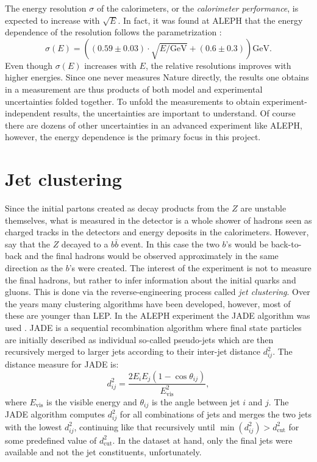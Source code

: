 The energy resolution $\sigma$ of the calorimeters, or the \emph{calorimeter performance}, is expected to increase with $\sqrt{E}$. In fact, it was found at ALEPH that the energy dependence of the resolution follows the parametrization \autocite{buskulicInvestigationBd0Bs01994}:
\begin{equation}
  \sigma(E) = \left( \left( 0.59 \pm 0.03 \right) \cdot \sqrt{E / \mathrm{GeV}} +  \left(0.6 \pm 0.3 \right) \right) \mathrm{GeV}.
\end{equation}
Even though $\sigma(E)$ increases with $E$, the relative resolutions improves with higher energies. Since one never measures Nature directly, the results one obtains in a measurement are thus products of both model and experimental uncertainties folded together. To unfold the measurements to obtain experiment-independent results, the uncertainties are important to understand. Of course there are dozens of other uncertainties in an advanced experiment like ALEPH, however, the energy dependence is the primary focus in this project. 

\section{Jet clustering}

Since the initial partons created as decay products from the $Z$ are unstable themselves, what is measured in the detector is a whole shower of hadrons seen as charged tracks in the detectors and energy deposits in the calorimeters. However, say that the $Z$  decayed to a $b\bar{b}$ event. In this case the two $b$'s would be back-to-back and the final hadrons would be observed approximately in the same direction as the $b$'s were created. The interest of the experiment is not to measure the final hadrons, but rather to infer information about the initial quarks and gluons. This is done via the reverse-engineering process called \emph{jet clustering}. Over the years many clustering algorithms have been developed, however, most of these are younger than LEP. In the ALEPH experiment the JADE algorithm was used \autocite{bartelExperimentalStudyJets1981}. JADE is a sequential recombination algorithm where final state particles are initially described as individual so-called pseudo-jets which are then recursively merged to larger jets according to their inter-jet distance $d^2_{ij}$. The distance measure for JADE is:
\begin{equation}
  d^2_{ij} = \frac{2E_i E_j (1 - \cos\theta_{ij})}{E^2_\mathrm{vis}},
\end{equation}
where $E_\mathrm{vis}$ is the visible energy and $\theta_{ij}$ is the angle between jet $i$ and $j$. The JADE algorithm computes $d^2_{ij}$ for all combinations of jets and merges the two jets with the lowest $d^2_{ij}$, continuing like that recursively until $\min(d^2_{ij}) > d^2_\mathrm{cut}$ for some predefined value of $d^2_\mathrm{cut}$. In the dataset at hand, only the final jets were available and not the jet constituents, unfortunately. 

